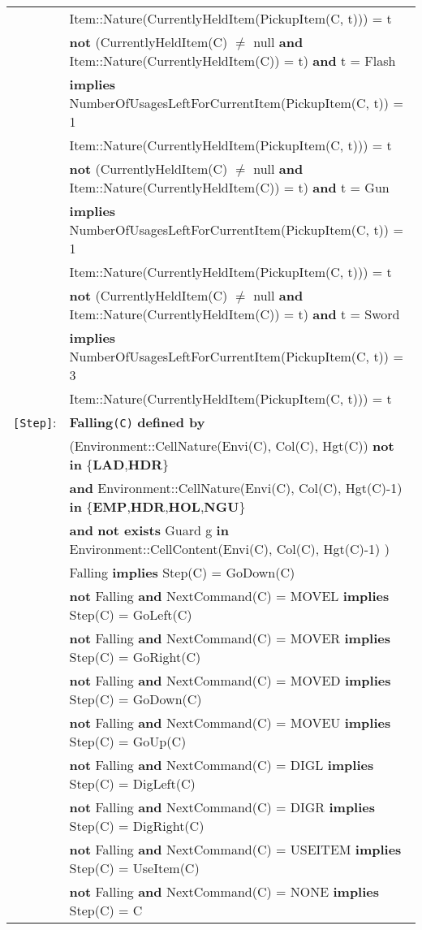 \documentclass[7pt]{article}
\begin{document}
\begin{tabular}{rl}
& \quad\quad Item::Nature(CurrentlyHeldItem(PickupItem(C, t))) = t \\
& \textbf{not} (CurrentlyHeldItem(C) $\neq$ null \textbf{and} Item::Nature(CurrentlyHeldItem(C)) = t) \textbf{and} t = Flash \\
& \quad \textbf{implies} NumberOfUsagesLeftForCurrentItem(PickupItem(C, t)) = 1 \\
& \quad\quad Item::Nature(CurrentlyHeldItem(PickupItem(C, t))) = t \\
& \textbf{not} (CurrentlyHeldItem(C) $\neq$ null \textbf{and} Item::Nature(CurrentlyHeldItem(C)) = t) \textbf{and} t = Gun \\
& \quad \textbf{implies} NumberOfUsagesLeftForCurrentItem(PickupItem(C, t)) = 1 \\
& \quad\quad Item::Nature(CurrentlyHeldItem(PickupItem(C, t))) = t \\
& \textbf{not} (CurrentlyHeldItem(C) $\neq$ null \textbf{and} Item::Nature(CurrentlyHeldItem(C)) = t) \textbf{and} t = Sword \\
& \quad \textbf{implies} NumberOfUsagesLeftForCurrentItem(PickupItem(C, t)) = 3 \\
& \quad\quad Item::Nature(CurrentlyHeldItem(PickupItem(C, t))) = t \\



\texttt{[Step]}:  & \textbf{Falling}\texttt{(C)} \textbf{defined by} \\ 
&\quad\quad (Environment::CellNature(Envi(C), Col(C), Hgt(C)) \textbf{not in} \{\textbf{LAD},\textbf{HDR}\}  \\
&\quad\quad \textbf{and} Environment::CellNature(Envi(C), Col(C), Hgt(C)-1) \textbf{in} \{\textbf{EMP},\textbf{HDR},\textbf{HOL},\textbf{NGU}\}  \\
& \quad\quad \textbf{and} \textbf{not exists} Guard g \textbf{in} Environment::CellContent(Envi(C), Col(C), Hgt(C)-1) )\\
& Falling \textbf{implies} Step(C) = GoDown(C) \\
& \textbf{not} Falling \textbf{and} NextCommand(C) = MOVEL \textbf{implies} Step(C) = GoLeft(C) \\
& \textbf{not} Falling \textbf{and} NextCommand(C) = MOVER \textbf{implies} Step(C) = GoRight(C) \\
& \textbf{not} Falling \textbf{and} NextCommand(C) = MOVED \textbf{implies} Step(C) = GoDown(C) \\
& \textbf{not} Falling \textbf{and} NextCommand(C) = MOVEU \textbf{implies} Step(C) = GoUp(C) \\
& \textbf{not} Falling \textbf{and} NextCommand(C) = DIGL \textbf{implies} Step(C) = DigLeft(C) \\
& \textbf{not} Falling \textbf{and} NextCommand(C) = DIGR \textbf{implies} Step(C) = DigRight(C) \\
& \textbf{not} Falling \textbf{and} NextCommand(C) = USEITEM \textbf{implies} Step(C) = UseItem(C) \\
& \textbf{not} Falling \textbf{and} NextCommand(C) = NONE \textbf{implies} Step(C) = C \\

\end{tabular}
\newpage
\end{document}

